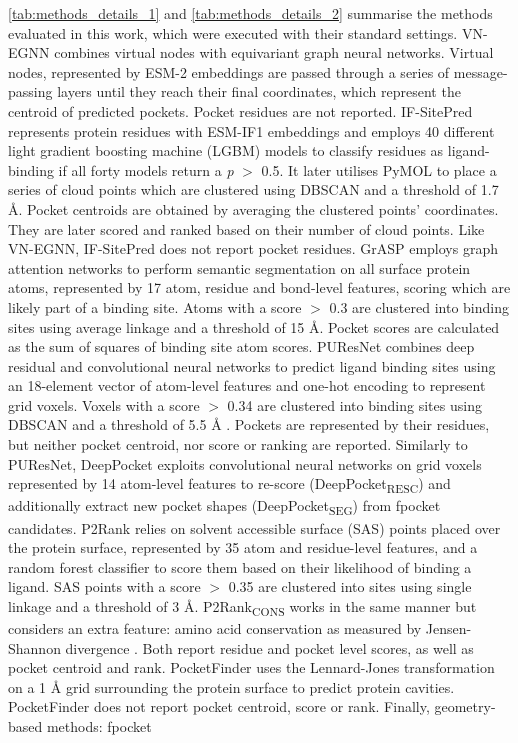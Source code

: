 \autoref{tab:methods_details_1} and \autoref{tab:methods_details_2} summarise the methods evaluated in this work, which were executed with their standard settings. VN-EGNN \cite{SESTAK_2024_VNEGNN} combines virtual nodes with equivariant graph neural networks. Virtual nodes, represented by ESM-2 embeddings \cite{RIVES_2021_EMBEDDINGS} are passed through a series of message-passing layers until they reach their final coordinates, which represent the centroid of predicted pockets. Pocket residues are not reported. IF-SitePred \cite{CARBERY_2024_IFSP} represents protein residues with ESM-IF1 embeddings \cite{HSU_2022_EMBEDDINGS} and employs 40 different light gradient boosting machine (LGBM) models \cite{KE_2017_LIGHTGBM} to classify residues as ligand-binding if all forty models return a \textit{p} $>$ 0.5. It later utilises PyMOL \cite{SCHRODINGER_2015_PYMOL} to place a series of cloud points which are clustered using DBSCAN \cite{ESTER_1996_DBSCAN}  and a threshold of 1.7 \AA{}. Pocket centroids are obtained by averaging the clustered points’ coordinates. They are later scored and ranked based on their number of cloud points. Like VN-EGNN, IF-SitePred does not report pocket residues. GrASP \cite{SMITH_2024_GrASP} employs graph attention networks to perform semantic segmentation on all surface protein atoms, represented by 17 atom, residue and bond-level features, scoring which are likely part of a binding site. Atoms with a score $>$ 0.3 are clustered into binding sites using average linkage and a threshold of 15 \AA{}. Pocket scores are calculated as the sum of squares of binding site atom scores. PUResNet \cite{KANDEL_2021_PURESNET} combines deep residual and convolutional neural networks to predict ligand binding sites using an 18-element vector of atom-level features and one-hot encoding to represent grid voxels. Voxels with a score $>$ 0.34 are clustered into binding sites using DBSCAN and a threshold of 5.5 \AA{} \cite{KANDEL_2024_PURESNET}. Pockets are represented by their residues, but neither pocket centroid, nor score or ranking are reported. Similarly to PUResNet, DeepPocket \cite{AGGARWAL_2022_DEEPPOCKET} exploits convolutional neural networks on grid voxels represented by 14 atom-level features to re-score (DeepPocket\textsubscript{RESC}) and additionally extract new pocket shapes (DeepPocket\textsubscript{SEG}) from fpocket candidates. P2Rank \cite{KRIVAK_2018_P2RANK} relies on solvent accessible surface (SAS) points placed over the protein surface, represented by 35 atom and residue-level features, and a random forest classifier to score them based on their likelihood of binding a ligand. SAS points with a score $>$ 0.35 are clustered into sites using single linkage and a threshold of 3 \AA{}. P2Rank\textsubscript{CONS} \cite{JENDELE_2019_PRANKWEB} works in the same manner but considers an extra feature: amino acid conservation as measured by Jensen-Shannon divergence \cite{CAPRA_2007_JSD}. Both report residue and pocket level scores, as well as pocket centroid and rank. PocketFinder \cite{AN_2005_POCKETFINDER} uses the Lennard-Jones \cite{JONES_1924_POTENTIAL} transformation on a 1 \AA{} grid surrounding the protein surface to predict protein cavities. PocketFinder does not report pocket centroid, score or rank. Finally, geometry-based methods: fpocket 